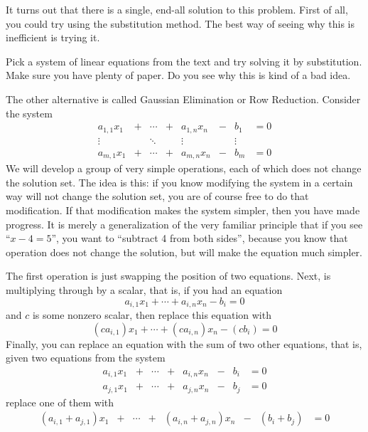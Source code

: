 It turns out that there is a single, end-all solution to this problem. 
First of all, you could try using the substitution method.  
The best way of seeing why this is inefficient is trying it.
\begin{UnimpEx}
  Pick a system of linear equations from the text and try solving it by substitution.
  Make sure you have plenty of paper.  
  Do you see why this is kind of a bad idea.
\end{UnimpEx}
The other alternative is called Gaussian Elimination or Row Reduction.  
Consider the system
\[\begin{array}{ccccccccc}
  a_{1,1}x_1 & + & \cdots & + & a_{1,n}x_n & - & b_1 & = 0\\
  \vdots     &   & \ddots &   & \vdots     &   & \vdots\\
  a_{m,1}x_1 & + & \cdots & + & a_{m,n}x_n & - & b_m & = 0
\end{array}\]
We will develop a group of very simple operations, each of which does not change the solution set.  
The idea is this:
if you know modifying the system in a certain way will not change the solution set, you are of course free to do that modification.
If that modification makes the system simpler, then you have made progress.  
It is merely a generalization of the very familiar principle that if you see ``$x-4=5$'', you want to ``subtract 4 from both sides'', because you know that operation does not change the solution, but will make the equation much simpler.  

The first operation is just swapping the position of two equations.  
Next, is multiplying through by a scalar, that is, if you had an equation
\[a_{i,1}x_1 + \cdots + a_{i,n}x_n - b_i  = 0\]
and $c$ is some nonzero scalar, then replace this equation with
\[(ca_{i,1})x_1 + \cdots + (ca_{i,n})x_n - (cb_i)  = 0\]
Finally, you can replace an equation with the sum of two other equations, that is, given two equations from the system
\[\begin{array}{ccccccccc}
  a_{i,1}x_1 & + & \cdots & + & a_{i,n}x_n & - & b_i & = 0\\
  a_{j,1}x_1 & + & \cdots & + & a_{j,n}x_n & - & b_j & = 0
\end{array}\]
replace one of them with
\[\begin{array}{ccccccccc}
  (a_{i,1} + a_{j,1})x_1 & + & \cdots & + & (a_{i,n} + a_{j,n})x_n & - & (b_i + b_j) & = 0
\end{array}\]

